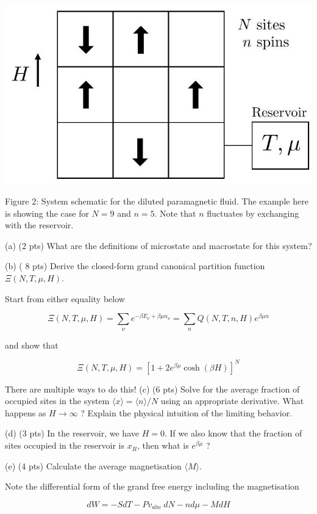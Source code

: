 \documentclass[10pt]{article}
\begin{document}
\begin{center}
\includegraphics[max width=\textwidth]{2024_02_03_75704bce2caff28cbfb1g-3}
\end{center}

Figure 2: System schematic for the diluted paramagnetic fluid. The example here is showing the case for $N=9$ and $n=5$. Note that $n$ fluctuates by exchanging with the reservoir.

(a) (2 pts) What are the definitions of microstate and macrostate for this system?

(b) ( 8 pts) Derive the closed-form grand canonical partition function $\Xi(N, T, \mu, H)$.

Start from either equality below

$$
\Xi(N, T, \mu, H)=\sum_{\nu} e^{-\beta E_{\nu}+\beta \mu n_{\nu}}=\sum_{n} Q(N, T, n, H) e^{\beta \mu n}
$$

and show that

$$
\Xi(N, T, \mu, H)=\left[1+2 e^{\beta \mu} \cosh (\beta H)\right]^{N}
$$

There are multiple ways to do this!
(c) (6 pts) Solve for the average fraction of occupied sites in the system $\langle x\rangle=\langle n\rangle / N$ using an appropriate derivative. What happens as $H \rightarrow \infty$ ? Explain the physical intuition of the limiting behavior.

(d) (3 pts) In the reservoir, we have $H=0$. If we also know that the fraction of sites occupied in the reservoir is $x_{R}$, then what is $e^{\beta \mu}$ ?

(e) (4 pts) Calculate the average magnetisation $\langle M\rangle$.

Note the differential form of the grand free energy including the magnetisation

$$
d W=-S d T-P v_{\text {site }} d N-n d \mu-M d H
$$
\end{document}
